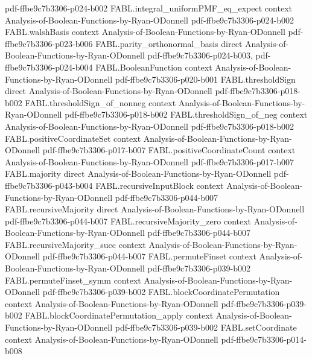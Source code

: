 \begin{theorem}
  {pdf-ffbe9c7b3306-p024-b002}
\proofstep
  {FABL.integral_uniformPMF_eq_expect}
  {context}
  {Analysis-of-Boolean-Functions-by-Ryan-ODonnell}
  {pdf-ffbe9c7b3306-p024-b002}
\proofstep
  {FABL.walshBasis}
  {context}
  {Analysis-of-Boolean-Functions-by-Ryan-ODonnell}
  {pdf-ffbe9c7b3306-p023-b006}
\proofstep
  {FABL.parity_orthonormal_basis}
  {direct}
  {Analysis-of-Boolean-Functions-by-Ryan-ODonnell}
  {pdf-ffbe9c7b3306-p024-b003,
    pdf-ffbe9c7b3306-p024-b004}
\proofstep
  {FABL.BooleanFunction}
  {context}
  {Analysis-of-Boolean-Functions-by-Ryan-ODonnell}
  {pdf-ffbe9c7b3306-p020-b001}
\proofstep
  {FABL.thresholdSign}
  {direct}
  {Analysis-of-Boolean-Functions-by-Ryan-ODonnell}
  {pdf-ffbe9c7b3306-p018-b002}
\proofstep
  {FABL.thresholdSign_of_nonneg}
  {context}
  {Analysis-of-Boolean-Functions-by-Ryan-ODonnell}
  {pdf-ffbe9c7b3306-p018-b002}
\proofstep
  {FABL.thresholdSign_of_neg}
  {context}
  {Analysis-of-Boolean-Functions-by-Ryan-ODonnell}
  {pdf-ffbe9c7b3306-p018-b002}
\proofstep
  {FABL.positiveCoordinateSet}
  {context}
  {Analysis-of-Boolean-Functions-by-Ryan-ODonnell}
  {pdf-ffbe9c7b3306-p017-b007}
\proofstep
  {FABL.positiveCoordinateCount}
  {context}
  {Analysis-of-Boolean-Functions-by-Ryan-ODonnell}
  {pdf-ffbe9c7b3306-p017-b007}
\proofstep
  {FABL.majority}
  {direct}
  {Analysis-of-Boolean-Functions-by-Ryan-ODonnell}
  {pdf-ffbe9c7b3306-p043-b004}
\proofstep
  {FABL.recursiveInputBlock}
  {context}
  {Analysis-of-Boolean-Functions-by-Ryan-ODonnell}
  {pdf-ffbe9c7b3306-p044-b007}
\proofstep
  {FABL.recursiveMajority}
  {direct}
  {Analysis-of-Boolean-Functions-by-Ryan-ODonnell}
  {pdf-ffbe9c7b3306-p044-b007}
\proofstep
  {FABL.recursiveMajority_zero}
  {context}
  {Analysis-of-Boolean-Functions-by-Ryan-ODonnell}
  {pdf-ffbe9c7b3306-p044-b007}
\proofstep
  {FABL.recursiveMajority_succ}
  {context}
  {Analysis-of-Boolean-Functions-by-Ryan-ODonnell}
  {pdf-ffbe9c7b3306-p044-b007}
\proofstep
  {FABL.permuteFinset}
  {context}
  {Analysis-of-Boolean-Functions-by-Ryan-ODonnell}
  {pdf-ffbe9c7b3306-p039-b002}
\proofstep
  {FABL.permuteFinset_symm}
  {context}
  {Analysis-of-Boolean-Functions-by-Ryan-ODonnell}
  {pdf-ffbe9c7b3306-p039-b002}
\proofstep
  {FABL.blockCoordinatePermutation}
  {context}
  {Analysis-of-Boolean-Functions-by-Ryan-ODonnell}
  {pdf-ffbe9c7b3306-p039-b002}
\proofstep
  {FABL.blockCoordinatePermutation_apply}
  {context}
  {Analysis-of-Boolean-Functions-by-Ryan-ODonnell}
  {pdf-ffbe9c7b3306-p039-b002}
\proofstep
  {FABL.setCoordinate}
  {context}
  {Analysis-of-Boolean-Functions-by-Ryan-ODonnell}
  {pdf-ffbe9c7b3306-p014-b008}

\end{theorem}
